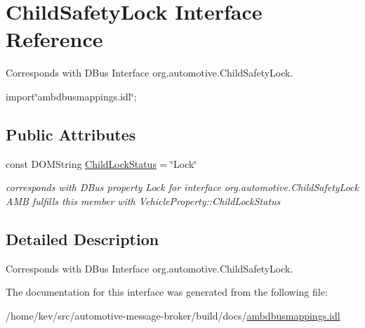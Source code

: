\hypertarget{interfaceChildSafetyLock}{\section{Child\+Safety\+Lock Interface Reference}
\label{interfaceChildSafetyLock}
}


Corresponds with D\+Bus Interface org.\+automotive.\+Child\+Safety\+Lock.  




{\ttfamily import\char`\"{}ambdbusmappings.\+idl\char`\"{};}

\subsection*{Public Attributes}
\begin{DoxyCompactItemize}
\item 
\hypertarget{interfaceChildSafetyLock_a9597ab8c513127f75063c19ff35cf2d3}{const D\+O\+M\+String \hyperlink{interfaceChildSafetyLock_a9597ab8c513127f75063c19ff35cf2d3}{Child\+Lock\+Status} = \char`\"{}Lock\char`\"{}}\label{interfaceChildSafetyLock_a9597ab8c513127f75063c19ff35cf2d3}

\begin{DoxyCompactList}\small\item\em corresponds with D\+Bus property Lock for interface org.\+automotive.\+Child\+Safety\+Lock A\+M\+B fulfills this member with Vehicle\+Property\+::\+Child\+Lock\+Status \end{DoxyCompactList}\end{DoxyCompactItemize}


\subsection{Detailed Description}
Corresponds with D\+Bus Interface org.\+automotive.\+Child\+Safety\+Lock. 

The documentation for this interface was generated from the following file\+:\begin{DoxyCompactItemize}
\item 
/home/kev/src/automotive-\/message-\/broker/build/docs/\hyperlink{ambdbusmappings_8idl}{ambdbusmappings.\+idl}\end{DoxyCompactItemize}
